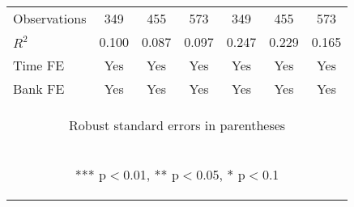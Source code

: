 \documentclass[]{article}
\begin{document}
\begin{center}
\begin{tabular}{lcccccc}
Observations & 349 & 455 & 573 & 349 & 455 & 573 \\
$R^2$ & 0.100 & 0.087 & 0.097 & 0.247 & 0.229 & 0.165 \\
Time FE & Yes & Yes & Yes & Yes & Yes & Yes \\
 Bank FE & Yes & Yes & Yes & Yes & Yes & Yes \\ \hline
\multicolumn{7}{c}{\begin{footnotesize} Robust standard errors in parentheses\end{footnotesize}} \\
\multicolumn{7}{c}{\begin{footnotesize} *** p$<$0.01, ** p$<$0.05, * p$<$0.1\end{footnotesize}} \\
\end{tabular}
\end{center}
\end{document}
